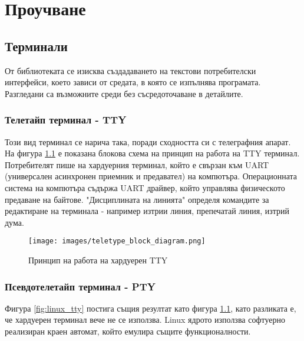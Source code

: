\chapter{Проучване}
\hfill
\section{Терминали}
От библиотеката се изисква създадаването на текстови потребителски интерфейси,
което зависи от средата, в която се изпълнява програмата. Разгледани са 
възможните среди без съсредоточаване в детайлите. \\
        \subsection{Телетайп терминал - TTY}
                Този вид терминал се нарича така, поради сходността си с 
                телеграфния апарат. На фигура \ref{fig:hw_tty} е показана
                блокова схема на принцип на работа на TTY терминал.
                Потребителят пише на хардуерния терминал, който е свързан към
                UART (универсален асинхронен приемник и предавател) на 
                компютъра. Операционната система на компютъра съдържа UART 
                драйвер, който управлява физическото предаване на байтове. 
                "Дисциплината на линията" определя командите за редактиране на 
                терминала - например изтрии линия, препечатай линия, 
                изтрий дума. \\
        
                \begin{figure}[H]
                        \centering
                        \texttt{[image: images/teletype\_block\_diagram.png]}
                        \caption{Принцип на работа на хардуерен TTY}
                        \label{fig:hw_tty}
                \end{figure}
                \vspace{10mm}

        \subsection{Псевдотелетайп терминал - PTY}
                Фигура \ref{fig:linux_tty} постига същия резултат като фигура
                \ref{fig:hw_tty}, като разликата е, че хардуерен терминал вече
                не се използва. Linux ядрото използва софтуерно реализиран 
                краен автомат, който емулира същите функционалности. \\
                \cite{tty}

